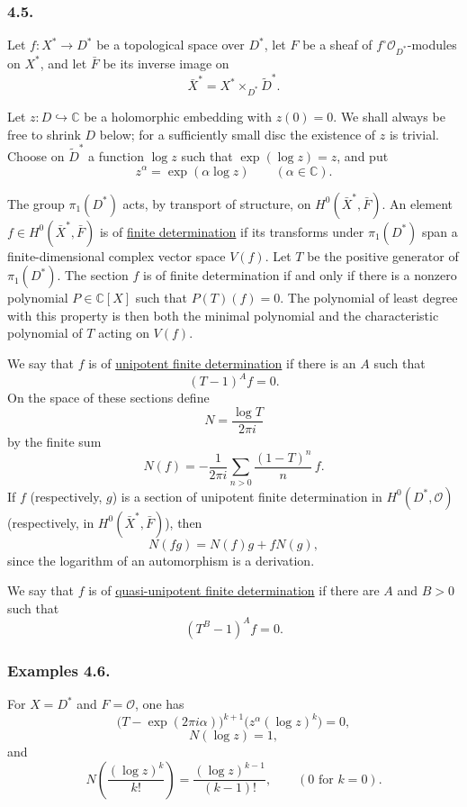 \subsubsection*{4.5.}
Let $f:X^*\longrightarrow D^*$ be a topological space over $D^*$,
let $F$ be a sheaf of $f^\circ\mathcal O_{D^*}$-modules on $X^*$,
and let $\bar F$ be its inverse image on
\[
\bar X^*=X^*\times_{D^*}\widetilde D^*.
\]

Let $z:D\hookrightarrow\mathbb C$ be a holomorphic embedding with
$z(0)=0$.  We shall always be free to shrink $D$ below; for a
sufficiently small disc the existence of $z$ is trivial.  Choose on
$\widetilde D^*$ a function $\log z$ such that
$\exp(\log z)=z$, and put
\[
z^\alpha=\exp(\alpha\log z)
\qquad(\alpha\in\mathbb C).
\]

The group $\pi_1(D^*)$ acts, by transport of structure, on
$H^0(\bar X^*,\bar F)$.  An element
$f\in H^0(\bar X^*,\bar F)$ is of \underline{finite determination}
if its transforms under $\pi_1(D^*)$ span a finite-dimensional
complex vector space $V(f)$.  Let $T$ be the positive generator of
$\pi_1(D^*)$.  The section $f$ is of finite determination if and only
if there is a nonzero polynomial $P\in\mathbb C[X]$ such that
$P(T)(f)=0$.  The polynomial of least degree with this property is
then both the minimal polynomial and the characteristic polynomial of
$T$ acting on $V(f)$.

We say that $f$ is of \underline{unipotent finite determination} if
there is an $A$ such that
\[
(T-1)^A f=0.
\]
On the space of these sections define
\[
N=\frac{\log T}{2\pi i}
\]
by the finite sum
\[
N(f)=-\frac1{2\pi i}
\sum_{n>0}\frac{(1-T)^n}{n}\,f.
\]
If $f$ (respectively, $g$) is a section of unipotent finite
determination in $H^0(D^*,\mathcal O)$ (respectively, in
$H^0(\bar X^*,\bar F)$), then
\[
N(fg)=N(f)g+fN(g),
\]
since the logarithm of an automorphism is a derivation.

We say that $f$ is of
\underline{quasi-unipotent finite determination} if there are
$A$ and $B>0$ such that
\[
(T^B-1)^A f=0.
\]

\subsubsection*{Examples 4.6.}
For $X=D^*$ and $F=\mathcal O$, one has
\[
\bigl(T-\exp(2\pi i\alpha)\bigr)^{k+1}
  \bigl(z^\alpha(\log z)^k\bigr)=0,
\]
\[
N(\log z)=1,
\]
and
\[
N\left(\frac{(\log z)^k}{k!}\right)
=\frac{(\log z)^{k-1}}{(k-1)!},
\qquad
(0\text{ for }k=0).
\]

